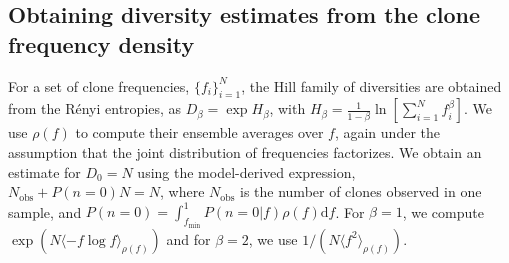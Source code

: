 % 


\subsection*{Obtaining diversity estimates from the clone frequency density}\label{sec:infer_div}
For a set of clone frequencies, $\{f_i\}_{i=1}^{N}$, the Hill family of diversities are obtained from the R\'enyi entropies, as $D_\beta=\exp H_\beta$, with $H_\beta=\frac{1}{1-\beta}\ln \left[ \sum_{i=1}^N f_i^{\beta}\right]$. We use $\rho(f)$ to compute their ensemble averages over $f$, again under the assumption that the joint distribution of frequencies factorizes. We obtain an estimate for $D_0=N$ using the model-derived expression, $N_{\textrm{obs}}+P(n=0)N=N$, where $N_{\textrm{obs}}$ is the number of clones observed in one sample, and $P(n=0)=\int_{f_{\textrm{min}}}^1 P(n=0|f)\rho(f)\textrm{d}f$. For $\beta=1$, we compute $\exp (N\langle -f\log f \rangle_{\rho(f)})$ and for $\beta=2$, we use $1/\left(N\langle f^2\rangle_{\rho(f)}\right)$.


